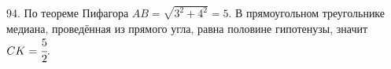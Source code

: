 94. По теореме Пифагора $AB=\sqrt{3^2+4^2}=5.$ В прямоугольном треугольнике медиана, проведённая из прямого угла, равна половине гипотенузы, значит $CK=\cfrac{5}{2}.$\\
